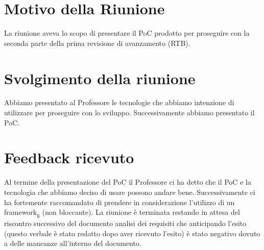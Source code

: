 \section{Motivo della Riunione}
La riunione aveva lo scopo di presentare il PoC prodotto per proseguire con la seconda parte della prima revisione di avanzamento (RTB).
\section{Svolgimento della riunione}
Abbiamo presentato al Professore le tecnologie che abbiamo intenzione di utilizzare per proseguire con lo sviluppo.
Successivamente abbiamo presentato il PoC.
\section{Feedback ricevuto}
Al termine della presentazione del PoC il Professore ci ha detto che il PoC e la tecnologia che abbiamo deciso di usare possono andare bene.
Successivamente ci ha fortemente raccomandato di prendere in considerazione l'utilizzo di un framework\textsubscript{g} (non bloccante).
La riunione è terminata restando in attesa del riscontro successivo del documento analisi dei requisiti che anticipando
l'esito (questo verbale è stato redatto dopo aver ricevuto l'esito) è stato negativo dovuto 
a delle mancanze all'interno del documento.